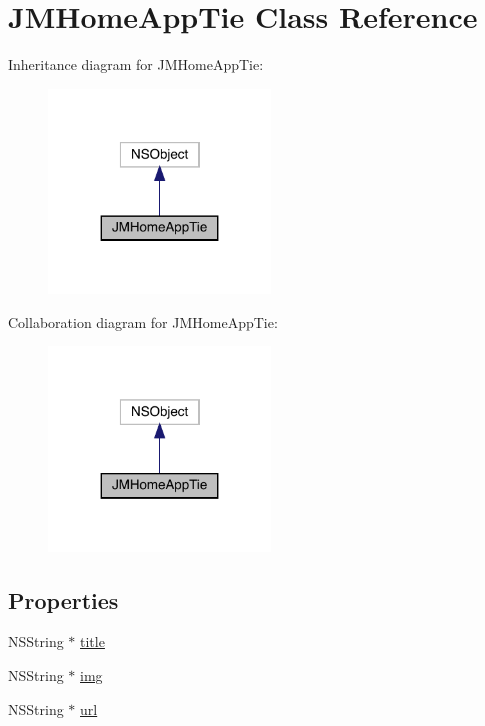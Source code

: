 \hypertarget{interface_j_m_home_app_tie}{}\section{J\+M\+Home\+App\+Tie Class Reference}
\label{interface_j_m_home_app_tie}


Inheritance diagram for J\+M\+Home\+App\+Tie\+:\nopagebreak
\begin{figure}[H]
\begin{center}
\leavevmode
\includegraphics[width=167pt]{interface_j_m_home_app_tie__inherit__graph}
\end{center}
\end{figure}


Collaboration diagram for J\+M\+Home\+App\+Tie\+:\nopagebreak
\begin{figure}[H]
\begin{center}
\leavevmode
\includegraphics[width=167pt]{interface_j_m_home_app_tie__coll__graph}
\end{center}
\end{figure}
\subsection*{Properties}
\begin{DoxyCompactItemize}
\item 
N\+S\+String $\ast$ \mbox{\hyperlink{interface_j_m_home_app_tie_aa2f2ed6becb9446f87791ecb9f9fc6fd}{title}}
\item 
N\+S\+String $\ast$ \mbox{\hyperlink{interface_j_m_home_app_tie_a62baf23848736ed321ae5bae006aee65}{img}}
\item 
N\+S\+String $\ast$ \mbox{\hyperlink{interface_j_m_home_app_tie_ab0dfba661b8b3c15d0349c44bf79379b}{url}}
\end{DoxyCompactItemize}


